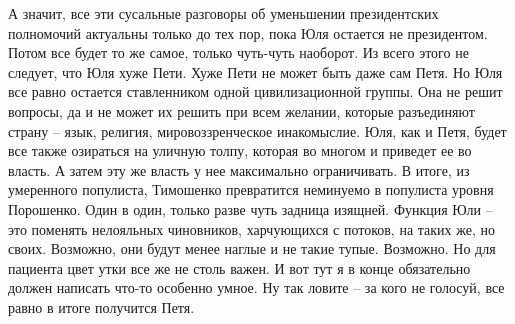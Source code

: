 А значит, все эти сусальные разговоры об уменьшении президентских полномочий актуальны только до тех пор, пока Юля остается не президентом. Потом все будет то же самое, только чуть-чуть наоборот.
Из всего этого не следует, что Юля хуже Пети. Хуже Пети не может быть даже сам Петя. Но Юля все равно остается ставленником одной цивилизационной группы. Она не решит вопросы, да и не может их решить при всем желании, которые разъединяют страну – язык, религия, мировоззренческое инакомыслие. Юля, как и Петя, будет все также озираться на уличную толпу, которая во многом и приведет ее во власть. А затем эту же власть у нее максимально ограничивать. В итоге, из умеренного популиста, Тимошенко превратится неминуемо в популиста уровня Порошенко. Один в один, только разве чуть задница изящней.
Функция Юли – это поменять нелояльных чиновников, харчующихся с потоков, на таких же, но своих. Возможно, они будут менее наглые и не такие тупые. Возможно. Но для пациента цвет утки все же не столь важен. И вот тут я в конце обязательно должен написать что-то особенно умное. Ну так ловите – за кого не голосуй, все равно в итоге получится Петя.

